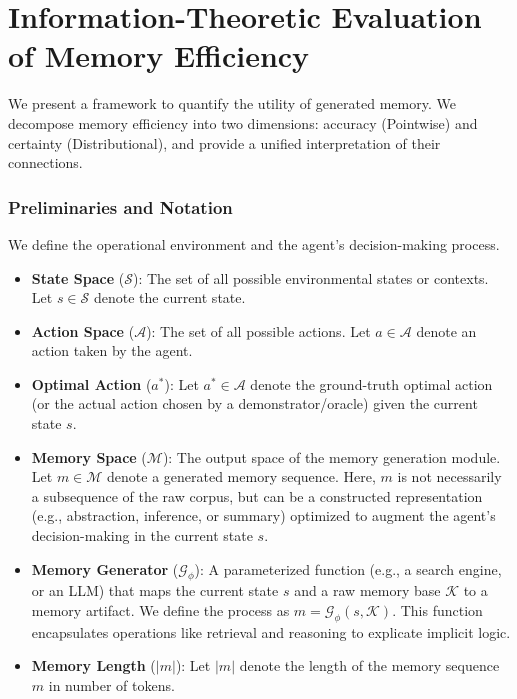 \section{Information-Theoretic Evaluation of Memory Efficiency}
We present a framework to quantify the utility of generated memory. We decompose memory efficiency into two dimensions: accuracy (Pointwise) and certainty (Distributional), and provide a unified interpretation of their connections.
\label{app:memory_information_density}
\subsubsection{Preliminaries and Notation}

We define the operational environment and the agent's decision-making process.

\begin{itemize}
    \item \textbf{State Space} ($\mathcal{S}$): The set of all possible environmental states or contexts. Let $s \in \mathcal{S}$ denote the current state.
    \item \textbf{Action Space} ($\mathcal{A}$): The set of all possible actions. Let $a \in \mathcal{A}$ denote an action taken by the agent.
    \item \textbf{Optimal Action} ($a^*$): Let $a^* \in \mathcal{A}$ denote the ground-truth optimal action (or the actual action chosen by a demonstrator/oracle) given the current state $s$.
    \item \textbf{Memory Space} ($\mathcal{M}$): The output space of the memory generation module. Let $m \in \mathcal{M}$ denote a generated memory sequence. Here, $m$ is not necessarily a subsequence of the raw corpus, but can be a constructed representation (e.g., abstraction, inference, or summary) optimized to augment the agent's decision-making in the current state $s$.
    \item \textbf{Memory Generator} ($\mathcal{G}_\phi$): A parameterized function (e.g., a search engine, or an LLM) that maps the current state $s$ and a raw memory base $\mathcal{K}$ to a memory artifact. We define the process as $m = \mathcal{G}_\phi(s, \mathcal{K})$. This function encapsulates operations like retrieval and reasoning to explicate implicit logic.
    \item \textbf{Memory Length} ($|m|$): Let $|m|$ denote the length of the memory sequence $m$ in number of tokens.
\end{itemize}


